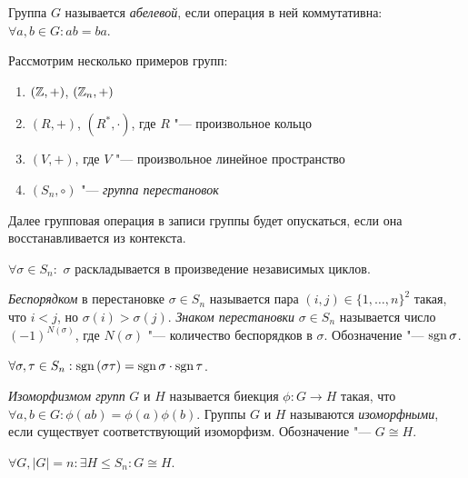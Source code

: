 \begin{definition}
	Группа $G$ называется \textit{абелевой}, если операция в ней коммутативна: $\forall a, b \in G: ab = ba$.
\end{definition}

\begin{example}
	Рассмотрим несколько примеров групп:
	\begin{enumerate}
		\item $(\mathbb{Z}, +)$, $(\mathbb{Z}_n, +)$
		
		\item $(R, +)$, $(R^*, \cdot)$, где $R$ "--- произвольное кольцо
		
		\item $(V, +)$, где $V$ "--- произвольное линейное пространство
		
		\item $(S_n, \circ)$ "--- \textit{группа перестановок}
	\end{enumerate}
	
	Далее групповая операция в записи группы будет опускаться, если она восстанавливается из контекста.
\end{example}

\begin{reminder}
	$\forall \sigma \in S_n:$ $\sigma$ раскладывается в произведение независимых циклов.
\end{reminder}

\begin{definition}
	\textit{Беспорядком} в перестановке $\sigma \in S_n$ называется пара $(i, j) \in \{1, \dotsc, n\}^2 $ такая, что $i < j$, но $\sigma(i) > \sigma(j)$. \textit{Знаком перестановки} $\sigma \in S_n$ называется число $(-1)^{N(\sigma)}$, где $N(\sigma)$ "--- количество беспорядков в $\sigma$. Обозначение "--- $\operatorname{\mathop{sgn}}{\sigma}$.
\end{definition}

\begin{reminder}
	$\forall \sigma, \tau \in S_n: \operatorname{\mathop{sgn}}{(\sigma\tau)} = \operatorname{\mathop{sgn}}{\sigma}\cdot\operatorname{\mathop{sgn}}{\tau}$.
\end{reminder}

\begin{definition}
	\textit{Изоморфизмом групп} $G$ и $H$ называется биекция $\phi: G \to H$ такая, что $\forall a, b \in G: \phi(ab) = \phi(a)\phi(b)$. Группы $G$ и $H$ называются \textit{изоморфными}, если существует соответствующий изоморфизм. Обозначение "--- $G \cong H$.
\end{definition}

\begin{reminder}
	$\forall G, |G| = n: \exists H \le S_n: G \cong H$.
\end{reminder}

